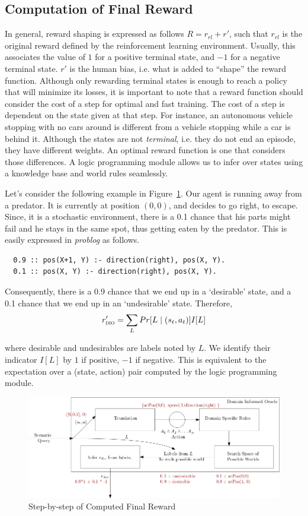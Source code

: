 \subsection{Computation of Final Reward}
\label{sec:comreward}
In general, reward shaping is expressed as follows
  $R = r_{rl} + r'$, 
such that $r_{rl}$ is the original reward defined by the reinforcement learning environment. Usually, this associates the value of $1$ for a positive terminal state, 
and $-1$ for a negative terminal state. $r'$ is the human bias, i.e.
what is added to ``shape'' the reward function. 
Although only rewarding terminal states is enough to reach a policy
that will minimize its losses, it is important to note that a reward
function should consider the cost of a step 
for optimal and fast training. The cost of a step is dependent on the state given at that step. For instance, an autonomous vehicle stopping with no cars around is different from a vehicle 
stopping while a car is behind it. Although the states are not
\emph{terminal}, i.e. they do not end an episode, they have different weights. 
An optimal reward function is one that considers those differences. A logic programming module allows us to infer over states using a knowledge base and world rules seamlessly. 

Let's consider the following example in Figure~\ref{fig:diospecs}.
Our agent is running away from a predator. It is currently at position $(0,0)$, and decides to go right, to escape. 
Since, it is a stochastic environment, there is a 0.1 chance that his parts might fail and he stays in the same spot, thus getting eaten by the predator. 
This is easily expressed in \emph{problog} as follows. 
\begin{verbatim}
  0.9 :: pos(X+1, Y) :- direction(right), pos(X, Y). 
  0.1 :: pos(X, Y) :- direction(right), pos(X, Y). 
\end{verbatim}
Consequently, there is a 0.9 chance that we end up in a `desirable'
state, and a 0.1 chance that we end up in an `undesirable' state.
Therefore, 
\[ 
   r'_{\textsc{dio}{}} = \sum_{L} Pr[L \mid (s_t, a_t)] I[L]
\] 

\noindent
where desirable and undesirables are labels noted by $L$. We identify their indicator $I[L]$ by $1$ if positive, $-1$ if negative.
This is equivalent to the expectation over a (state, action) pair computed by the logic programming module. 
\begin{figure}
  \centering
  \includegraphics[scale=0.45]{figures/diospecs.png}
  \caption{Step-by-step of Computed Final Reward}
  \label{fig:diospecs}
\end{figure}

